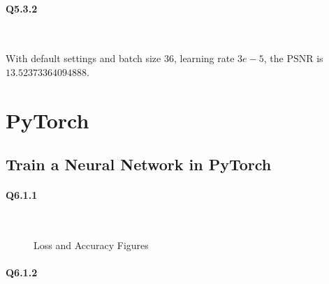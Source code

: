 \documentclass[11pt]{article} \usepackage{fullpage} \usepackage{graphicx} \usepackage{epstopdf} \usepackage{color} \usepackage{psfrag} \usepackage{pdfsync}\usepackage{indentfirst}\usepackage{subfigure}\usepackage{float}\usepackage[section]{placeins}
\begin{document}
\paragraph{Q5.3.2}~{}

With default settings and batch size $36$, learning rate $3e-5$, the $\mathrm{PSNR}$ is $13.52373364094888$.

\section{PyTorch}
\subsection{Train a Neural Network in PyTorch}
\paragraph{Q6.1.1}~{}

\begin{figure}[H]
\centering
{}
\caption{Loss and Accuracy Figures}
\end{figure}


\paragraph{Q6.1.2}~{}
\end{document}
